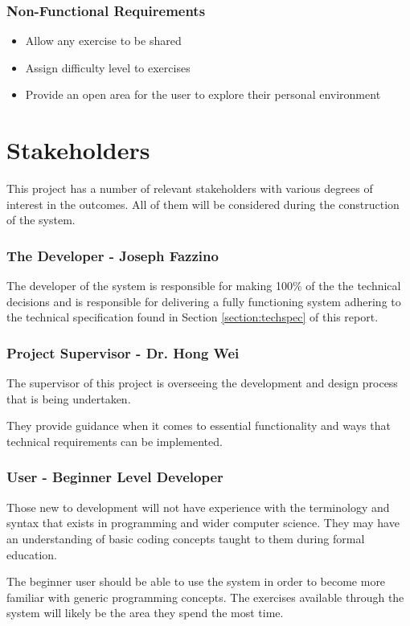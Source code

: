 \subsubsection{Non-Functional Requirements}
\begin{itemize}
    \item Allow any exercise to be shared
    \item Assign difficulty level to exercises
    \item Provide an open area for the user to explore their personal environment
\end{itemize}

\section{Stakeholders} \label{section:probart-stake}
This project has a number of relevant stakeholders with various degrees of interest in the outcomes. All of them will be considered during the construction of the system.

\subsubsection{The Developer - Joseph Fazzino}
The developer of the system is responsible for making 100\% of the the technical decisions and is responsible for delivering a fully functioning system adhering to the technical specification found in  Section \ref{section:techspec} of this report.

\subsubsection{Project Supervisor - Dr. Hong Wei}
The supervisor of this project is overseeing the development and design process that is being undertaken. 

They provide guidance when it comes to essential functionality and ways that technical requirements can be implemented.

\subsubsection{User - Beginner Level Developer}
Those new to development will not have experience with the terminology and syntax that exists in programming and wider computer science. They may have an understanding of basic coding concepts taught to them during formal education.

The beginner user should be able to use the system in order to become more familiar with generic programming concepts. The exercises available through the system will likely be the area they spend the most time.

